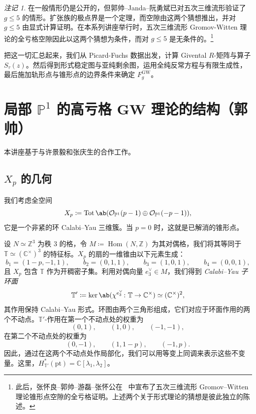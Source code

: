 \documentclass{amsart}
\theoremstyle{definition}
\theoremstyle{remark}
\newtheorem{rmk}[thm]{注记}
\theoremstyle{plain}
\theoremstyle{definition}
\theoremstyle{remark}
\newcommand{\C}{\mathbb{C}}
\newcommand{\Z}{\mathbb{Z}}
\renewcommand{\P}{\mathbb{P}}
\newcommand{\mc}[1]{\mathcal{#1}}
\newcommand{\T}{\mathbb{T}}
\newcommand{\mr}[1]{\mathrm{#1}}
\newcommand{\on}[1]{\operatorname{#1}}
\newcommand{\1}{\mathbf{1}}
\newcommand{\2}{\mathbf{2}}
\newcommand{\3}{\mathbf{3}}
\DeclareMathOperator{\Hom}{Hom}
\begin{document}
\begin{rmk}
     在一般情形仍是公开的，但郭帅–Janda–阮勇斌已对五次三维流形验证了 \(g \leq 5\) 的情形。扩张族的极点界是一个定理，而空隙由这两个猜想推出，并对 \(g \leq 5\) 由显式计算证明。在本系列讲座举行时，五次三维流形 Gromov-Witten 理论的全亏格空隙因此以这两个猜想为条件，而对 \(g \leq 5\) 是无条件的。\footnote{此后，张怀良–郭帅–游磊–张怀公在~\cite{CGYZ2026} 中宣布了五次三维流形 Gromov--Witten 理论锥形点空隙的全亏格证明。上述两个关于形式理论的猜想是彼此独立的陈述。}
\end{rmk}

把这一切汇总起来，我们从 Picard-Fuchs 数据出发，计算 Givental \(R\)-矩阵与算子 \(S_{\tau}(z)\)。然后得到形式稳定图与亚纯剩余图，运用全纯反常方程与有限生成性，最后施加轨形点与锥形点的边界条件来确定 \(F_g^{\mr{GW}}\)。
\section{\texorpdfstring{局部 \(\P^1\) 的高亏格 GW 理论的结构}{局部 P1 的高亏格 GW 理论的结构}（郭帅）}%
\label{sec:Structure of higher-genus GW theory of local P1 (Shuai Guo)}

本讲座基于与许景毅和张庆生的合作工作。

\subsection{\(X_p\) 的几何}%
\label{sub:The geometry of Xp}

我们考虑全空间
\[ X_p \coloneqq \on{Tot}\ab(\mc{O}_{\P^1}(p-1) \oplus \mc{O}_{\P^1}(-p-1)), \]
它是一个非紧的环 Calabi--Yau 三维簇。当 \(p = 0\) 时，这就是已解消的锥形点。

设 \(N \simeq \Z^3\) 为秩 \(3\) 的格，令 \(M \coloneqq \Hom(N,\Z)\) 为其对偶格，我们将其等同于 \(\T \simeq (\C^{\times})^3\) 的特征标。\(X_p\) 的扇的一维锥由以下元素生成：
\[ b_1 = (1-p,-1,1), \qquad b_2 = (0,1,1), \qquad b_3 = (1,0,1), \qquad b_4 = (0,0,1), \]
且 \(X_p\) 包含 \(\T\) 作为开稠密子集。利用对偶向量 \(e_3^{\vee} \in M\)，我们得到 \textit{Calabi--Yau 子环面}
\[ \T' \coloneqq \ker\ab(\chi^{e_3^{\vee}} \colon \T \to \C^{\times}) \simeq (\C^{\times})^2, \]
其作用保持 Calabi--Yau 形式。环图由两个三角形组成，它们对应于环面作用的两个不动点。\(\T'\)-作用在第一个不动点处的权重为
\[ (0,1), \qquad (1,0), \qquad (-1,-1), \]
在第二个不动点处的权重为
\[ (0,-1), \qquad (1,1-p), \qquad (-1,p). \]
因此，通过在这两个不动点处作局部化，我们可以用等变上同调来表示这些不变量。这里，\(H^*_{\T'}(\mr{pt}) = \C[\lambda_1,\lambda_2]\)。
\end{document}
